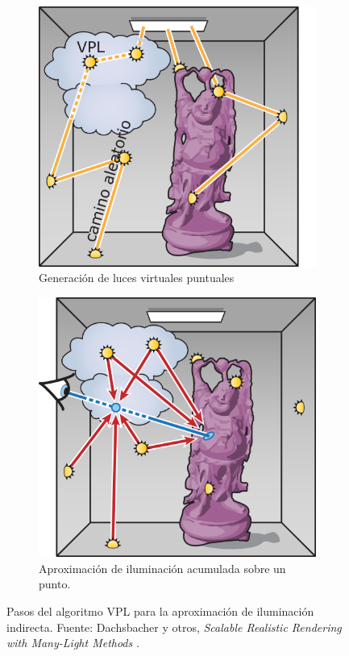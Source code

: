 \begin{figure}[H]
	\centering
	\begin{subfigure}[h]{0.35\textwidth}
		\centering
		\captionsetup{justification=centering}
		\includegraphics[width=\linewidth]{media/vpl1.png}
		\caption*{Generación de luces virtuales puntuales}
	\end{subfigure}
	\hspace{0.1\textwidth}
	\begin{subfigure}[h]{0.35\textwidth}
		\centering
		\captionsetup{justification=centering}
		\includegraphics[width=\linewidth]{media/vpl2.png}
		\caption*{Aproximación de iluminación acumulada sobre un punto.}
	\end{subfigure}
	\caption{Pasos del algoritmo \ac{VPL} para la aproximación de iluminación indirecta. Fuente: Dachsbacher y otros, \emph{Scalable Realistic Rendering with Many-Light Methods} \cite{Dachsbacher2014ManyLights}.}
	\label{fig:vpl_passes}
\end{figure}


